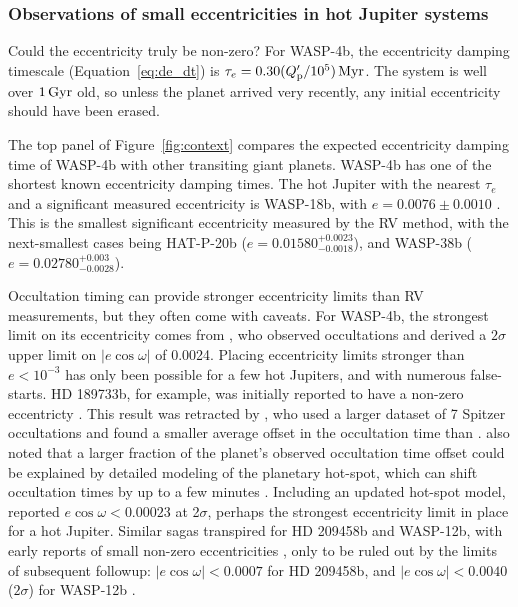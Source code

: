 \documentclass[12pt,twocolumn,tighten]{aastex62}
\begin{document}
\subsubsection{Observations of small eccentricities in hot
Jupiter systems}

Could the eccentricity truly be non-zero?  For WASP-4b, the
eccentricity damping timescale (Equation~\ref{eq:de_dt}) is $\tau_e =
0.30 (Q_{\rm p}'/10^5) \, {\rm Myr}$.  The system is well over
$1\,{\rm Gyr}$ old, so unless the planet arrived very recently, any
initial eccentricity should have been erased.

The top panel of Figure~\ref{fig:context} compares the expected
eccentricity damping time of WASP-4b with other transiting giant
planets.  WASP-4b has one of the shortest known eccentricity damping
times.  The hot Jupiter with the nearest $\tau_e$ and a significant
measured eccentricity is WASP-18b, with $e = 0.0076 \pm 0.0010$
\citep{triaud_spin-orbit_2010,bonomo_gaps_2017}.  This is the smallest
significant eccentricity measured by the RV method, with the
next-smallest cases being HAT-P-20b ($e =
0.01580^{+0.0023}_{-0.0018}$), and WASP-38b ($e =
0.02780^{+0.003}_{-0.0028}$).

Occultation timing can provide stronger eccentricity limits than RV
measurements, but they often come with caveats.  For WASP-4b, the
strongest limit on its eccentricity comes from
\citet{beerer_secondary_2011}, who observed occultations and derived a
$2\sigma$ upper limit on $| e\cos\omega | $ of 0.0024.
Placing eccentricity limits stronger than $e< 10^{-3}$ has only been
possible for a few hot Jupiters, and with numerous false-starts.  HD
189733b, for example, was initially reported to have a non-zero
eccentricty \citep{knutson_map_2007}.  This result was retracted by
\citet{agol_climate_2010}, who used a larger dataset of 7 Spitzer
occultations and found a smaller average offset in the occultation
time than \citet{knutson_map_2007}.  \citet{agol_climate_2010} also
noted that a larger fraction of the planet's observed occultation time
offset could be explained by detailed modeling of the planetary
hot-spot, which can shift occultation times by up to a few minutes
\citep{williams_resolving_2006}.  Including an updated hot-spot model,
\citet{agol_climate_2010} reported $e\cos\omega < 0.00023$ at
2$\sigma$, perhaps the strongest eccentricity limit in place for a hot
Jupiter.  Similar sagas transpired for HD 209458b and WASP-12b, with
early reports of small non-zero eccentricities
\citep{winn_measurement_2005,hebb_wasp-12b_2009,lopez-morales_day-side_2010},
only to be ruled out by the limits of subsequent followup:
$|e\cos\omega| < 0.0007$ for HD 209458b, and $| e\cos\omega| < 0.0040$
($2\sigma$) for WASP-12b
\citep{crossfield_spitzer_mips_2012,campo_orbit_2011,croll_near-infrared_2011}.
\end{document}
